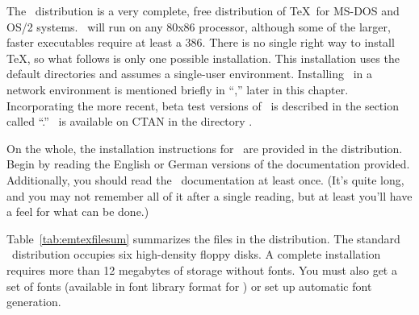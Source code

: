 The \emTeX\ distribution 
is a very complete, free distribution of \TeX\
for MS-DOS and OS/2 systems.  \emTeX\ will run on any 80x86 
processor, although some of the larger, faster executables require at 
least a 386.
There is no single right way to
install \TeX, so what follows is only one possible installation.  This
installation uses the default directories and assumes a single-user
environment.  Installing \emTeX\ in a network environment is mentioned
briefly in ``\textit{\nameref{sec:netemtex}},'' later in this chapter.
Incorporating the more recent, beta test versions of \emTeX\ is described
in the section called
\linebreak
\newpage
``.''
\emTeX\ is available on CTAN in the directory 
.

On the whole, the installation instructions for \emTeX\ are provided in the
distribution.  Begin by reading the English or German versions of the
documentation provided.  Additionally, you should read the \dvidriver\
documentation at least once. (It's quite long, and you may not remember all of
it after a single reading, but at least you'll have a feel for what can be
done.)

Table~\ref{tab:emtexfilesum} summarizes the files in the distribution.
The standard \emTeX\ distribution occupies six high-density floppy disks.
A complete installation requires more than 12 megabytes of storage 
without fonts.  You must also get a set of fonts (available in
font library format for \emTeX) or set up automatic font generation.

